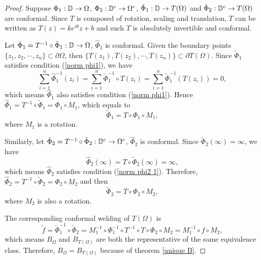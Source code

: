 \documentclass[review,onefignum,onetabnum]{siamonline190516}
\begin{document}
    \begin{proof}
        Suppose $\Phi_1 : \mathbb{D} \rightarrow \Omega$, $\Phi_2: \mathbb{D}^c \rightarrow \Omega^c$, $\tilde{\Phi}_1: \mathbb{D} \rightarrow T(\Omega)$ and $\tilde{\Phi}_2 : \mathbb{D}^c \rightarrow T(\Omega)$ are conformal. Since $T$ is composed of rotation, scaling and translation, $T$ can be written as $T(z) = ke^{i\theta} z + b$ and such $T$ is absolutely invertible and conformal.
        
        Let $\hat{\Phi}_1 =  T^{-1} \circ \tilde{\Phi}_1 : \mathbb{D} \rightarrow \Omega$, $\hat{\Phi}_1$ is conformal. Given the boundary points $\{z_1, z_2, \cdots, z_n\} \subset \partial \Omega$, then $\{T(z_1), T(z_2), \cdots, T(z_n)\} \subset \partial T(\Omega)$. Since $\tilde{\Phi}_1$ satisfies condition (\ref{norm phi1}), we have
        \begin{equation*}
            \sum_{i=1}^n \hat{\Phi}_1^{-1}(z_i) = \sum_{i=1}^n \tilde{\Phi}_1^{-1} \circ T(z_i) = \sum_{i=1}^n \tilde{\Phi}_1^{-1}(T(z_i)) = 0,
        \end{equation*}
        which means $\hat{\Phi}_1$ also satisfies condition (\ref{norm phi1}). Hence $\hat{\Phi}_1 =  T^{-1} \circ \tilde{\Phi}_1= \Phi_1 \circ M_1$, which equals to
        \begin{equation}
            \tilde{\Phi}_1 = T \circ \Phi_1 \circ M_1,
        \end{equation}
        where $M_1$ is a rotation.

        Similarly, let $\hat{\Phi}_2 = T^{-1} \circ \tilde{\Phi}_2: \mathbb{D}^c \rightarrow \Omega^c$, $\hat{\Phi}_2$ is conformal. Since $\tilde{\Phi}_2(\infty) = \infty$, we have
        \begin{equation*}
            \hat{\Phi}_2(\infty) = T \circ \tilde{\Phi}_2(\infty) = \infty,
        \end{equation*}
        which means $\hat{\Phi}_2$ satisfies condition (\ref{norm phi2 1}). Therefore, $\hat{\Phi}_2 = T^{-1} \circ \tilde{\Phi}_2 = \Phi_2 \circ M_2$ and then
        \begin{equation}
            \tilde{\Phi}_2 = T \circ \Phi_2 \circ M_2,
        \end{equation}
        where $M_2$ is also a rotation.

        The corresponding conformal welding of $T(\Omega)$ is
        \begin{equation*}
            \tilde{f}
            = \tilde{\Phi}_1^{-1} \circ \tilde{\Phi}_2 
            = M_1^{-1} \circ \Phi_1^{-1} \circ T^{-1} \circ T \circ \Phi_2 \circ M_2 
            = M_1^{-1} \circ f \circ M_2,
        \end{equation*}
        which means $B_\Omega$ and $B_{T(\Omega)}$ are both the representative of the same equivalence class. Therefore, $B_\Omega = B_{T(\Omega)}$ because of theorem \ref{unique B}.
    \end{proof}
\end{document}
